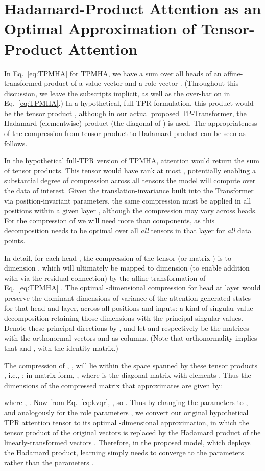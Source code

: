 \documentclass[11pt,a4paper]{article}
\newcommand{\ischl}[1]{{#1}}
\begin{document}
\ischl{
\section{Hadamard-Product Attention as an Optimal Approximation of Tensor-Product Attention}
In Eq.~\ref{eq:TPMHA} for TPMHA, we have a sum over all  heads of an affine-transformed product of a value vector  and a role vector .
(Throughout this discussion, we leave the subscripts  implicit, as well as the over-bar on  in Eq.~\ref{eq:TPMHA}.)
In a hypothetical, full-TPR formulation, this product would be the tensor product , although in our actual proposed TP-Transformer, the Hadamard (elementwise) product  (the diagonal of ) is used.
The appropriateness of the compression from tensor product to Hadamard product can be seen as follows.

In the hypothetical full-TPR version of TPMHA, attention would return the sum of  tensor products.
This tensor  would have rank at most , potentially enabling a substantial degree of compression across all tensors the model will compute over the data of interest.
Given the translation-invariance built into the Transformer via position-invariant parameters, 
the same compression must be applied in all positions within a given layer , although the compression may vary across heads.
For the compression of  we will need more than  components, as this decomposition needs to be optimal over all \emph{all} tensors in that layer for \emph{all} data points.


In detail, for each head , the compression of the tensor 
 (or matrix )
is to dimension , which will ultimately be mapped to dimension  (to enable addition with  via the residual connection) by the affine transformation of Eq.~\ref{eq:TPMHA} .
The optimal -dimensional compression for head  at layer  would preserve the  dominant dimensions of variance of the attention-generated states for that head and layer, across all positions and inputs: a kind of singular-value decomposition retaining those dimensions with the principal singular values.
Denote these principal directions by , and let  and  respectively be the  matrices with the orthonormal vectors  and  as columns.
(Note that orthonormality implies that  and , with  the  identity matrix.)
 
The compression of , , will lie within the space spanned by these  tensor products , i.e., ; in matrix form, , where  is the  diagonal matrix with elements .
Thus the  dimensions  of the compressed matrix  that approximates  are given by:



where , .
Now from Eq.~\ref{eq:kvqr}, , so .
Thus by changing the parameters  to , and analogously for the role parameters , we convert our original hypothetical TPR attention tensor  to its optimal -dimensional approximation, in which the tensor product of the original vectors  is replaced by the Hadamard product of the linearly-transformed vectors .
Therefore, in the proposed model, which deploys the Hadamard product, learning simply needs to converge to the parameters  rather than the parameters .
}
\end{document}
